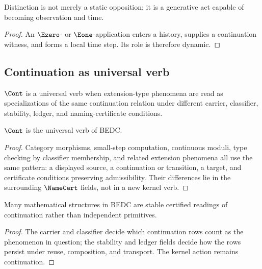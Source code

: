\begin{corollary}
\label{cor:philosophy-distinction-dynamic}
Distinction is not merely a static opposition; it is a generative act
capable of becoming observation and time.
\end{corollary}
\begin{proof}
An \(\Ezero\)- or \(\Eone\)-application enters a history, supplies a
continuation witness, and forms a local time step. Its role is
therefore dynamic.
\end{proof}

\subsection{Continuation as universal verb}
\label{subsec:philosophy-continuation-universal-verb}

\begin{definition}
\label{def:philosophy-universal-verb}
\(\Cont\) is a universal verb when extension-type phenomena are read as
specializations of the same continuation relation under different
carrier, classifier, stability, ledger, and naming-certificate
conditions.
\end{definition}

\begin{theorem}
\label{thm:philosophy-continuation-universal-verb}
\(\Cont\) is the universal verb of BEDC.
\end{theorem}
\begin{proof}
Category morphisms, small-step computation, continuous moduli, type
checking by classifier membership, and related extension phenomena all
use the same pattern: a displayed source, a continuation or transition,
a target, and certificate conditions preserving admissibility. Their
differences lie in the surrounding \(\NameCert\) fields, not in a new
kernel verb.
\end{proof}

\begin{corollary}
\label{cor:philosophy-mathematical-structure-stabilized-continuation}
Many mathematical structures in BEDC are stable certified readings of
continuation rather than independent primitives.
\end{corollary}
\begin{proof}
The carrier and classifier decide which continuation rows count as the
phenomenon in question; the stability and ledger fields decide how the
rows persist under reuse, composition, and transport. The kernel action
remains continuation.
\end{proof}

